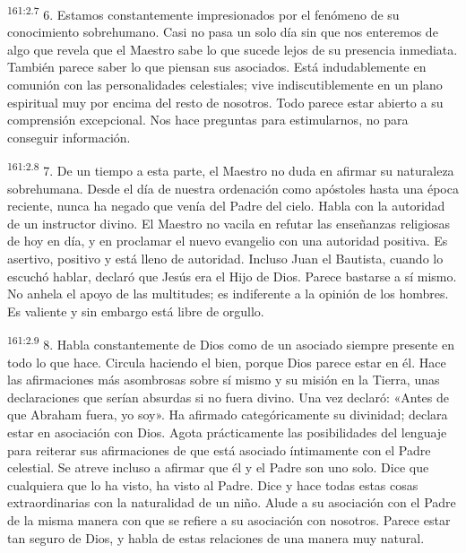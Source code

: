 \par 
\textsuperscript{161:2.7} 6. Estamos constantemente impresionados por el fenómeno de su conocimiento sobrehumano. Casi no pasa un solo día sin que nos enteremos de algo que revela que el Maestro sabe lo que sucede lejos de su presencia inmediata. También parece saber lo que piensan sus asociados. Está indudablemente en comunión con las personalidades celestiales; vive indiscutiblemente en un plano espiritual muy por encima del resto de nosotros. Todo parece estar abierto a su comprensión excepcional. Nos hace preguntas para estimularnos, no para conseguir información.

\par 
\textsuperscript{161:2.8} 7. De un tiempo a esta parte, el Maestro no duda en afirmar su naturaleza sobrehumana. Desde el día de nuestra ordenación como apóstoles hasta una época reciente, nunca ha negado que venía del Padre del cielo. Habla con la autoridad de un instructor divino. El Maestro no vacila en refutar las enseñanzas religiosas de hoy en día, y en proclamar el nuevo evangelio con una autoridad positiva. Es asertivo, positivo y está lleno de autoridad. Incluso Juan el Bautista, cuando lo escuchó hablar, declaró que Jesús era el Hijo de Dios. Parece bastarse a sí mismo. No anhela el apoyo de las multitudes; es indiferente a la opinión de los hombres. Es valiente y sin embargo está libre de orgullo.

\par 
\textsuperscript{161:2.9} 8. Habla constantemente de Dios como de un asociado siempre presente en todo lo que hace. Circula haciendo el bien, porque Dios parece estar en él. Hace las afirmaciones más asombrosas sobre sí mismo y su misión en la Tierra, unas declaraciones que serían absurdas si no fuera divino. Una vez declaró: «Antes de que Abraham fuera, yo soy». Ha afirmado categóricamente su divinidad; declara estar en asociación con Dios. Agota prácticamente las posibilidades del lenguaje para reiterar sus afirmaciones de que está asociado íntimamente con el Padre celestial. Se atreve incluso a afirmar que él y el Padre son uno solo. Dice que cualquiera que lo ha visto, ha visto al Padre. Dice y hace todas estas cosas extraordinarias con la naturalidad de un niño. Alude a su asociación con el Padre de la misma manera con que se refiere a su asociación con nosotros. Parece estar tan seguro de Dios, y habla de estas relaciones de una manera muy natural.

